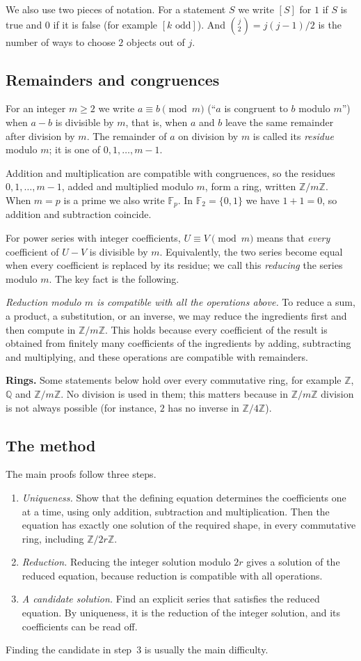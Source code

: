 \documentclass[11pt,a4paper]{article}
\theoremstyle{definition}
\theoremstyle{remark}
\newcommand{\Z}{\mathbb{Z}}
\newcommand{\Q}{\mathbb{Q}}
\newcommand{\F}{\mathbb{F}}
\newcommand{\para}[1]{\par\medskip\noindent\textbf{#1}\enspace}
\begin{document}
We also use two pieces of notation. For a statement $S$ we write $[S]$ for $1$ if $S$ is true and $0$ if it is false
(for example $[k\text{ odd}]$). And $\binom{j}{2}=j(j-1)/2$ is the number of ways to choose $2$ objects out of $j$.

\subsection{Remainders and congruences}
For an integer $m\ge2$ we write $a\equiv b\pmod m$ (``$a$ is congruent to $b$ modulo $m$'') when $a-b$ is divisible by
$m$, that is, when $a$ and $b$ leave the same remainder after division by $m$. The remainder of $a$ on division by
$m$ is called its \emph{residue} modulo $m$; it is one of $0,1,\dots,m-1$.

Addition and multiplication are compatible with congruences, so the residues $0,1,\dots,m-1$, added and multiplied
modulo $m$, form a ring, written $\Z/m\Z$. When $m=p$ is a prime we also write $\F_p$. In $\F_2=\{0,1\}$ we have $1+1=0$,
so addition and subtraction coincide.

For power series with integer coefficients, $U\equiv V\pmod m$ means that \emph{every} coefficient of $U-V$ is
divisible by $m$. Equivalently, the two series become equal when every coefficient is replaced by its residue; we call
this \emph{reducing} the series modulo $m$. The key fact is the following.

\emph{Reduction modulo $m$ is compatible with all the operations above.} To reduce a sum, a product, a substitution, or
an inverse, we may reduce the ingredients first and then compute in $\Z/m\Z$. This holds because every
coefficient of the result is obtained from finitely many coefficients of the ingredients by adding, subtracting and
multiplying, and these operations are compatible with remainders.

\para{Rings.} Some statements below hold over every commutative ring, for example $\Z$, $\Q$ and $\Z/m\Z$. No
division is used in them; this matters because in $\Z/m\Z$ division is not always possible (for instance, $2$ has no inverse in
$\Z/4\Z$).

\subsection{The method}
The main proofs follow three steps.
\begin{enumerate}
\item \emph{Uniqueness.} Show that the defining equation determines the coefficients one at a time, using only
addition, subtraction and multiplication. Then the equation has exactly one solution of the required shape, in every
commutative ring, including $\Z/2r\Z$.
\item \emph{Reduction.} Reducing the integer solution modulo $2r$ gives a solution of the reduced equation,
because reduction is compatible with all operations.
\item \emph{A candidate solution.} Find an explicit series that satisfies the reduced equation. By uniqueness, it is
the reduction of the integer solution, and its coefficients can be read off.
\end{enumerate}
Finding the candidate in step~3 is usually the main difficulty.
\end{document}
